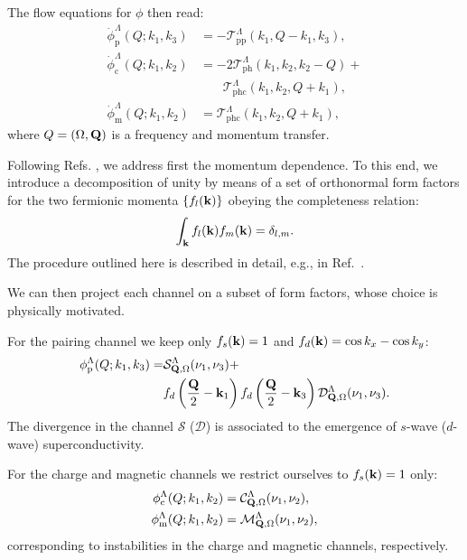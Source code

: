 The flow equations for $\phi$ then read: 
\begin{align}
\dot{\phi}_{\mathrm{p}}^{\Lambda}(Q;k_1,k_3) &= -\mathcal{T}^{\Lambda}_{\mathrm{pp}}(k_1,Q-k_1,k_3) , \\
\nonumber 
\dot{\phi}_{\mathrm{c}}^{\Lambda}(Q;k_1,k_2) &= 
 -2\mathcal{T}^{\Lambda}_{\mathrm{ph}}(k_1,k_2,k_2-Q) +\\
&\phantom{=}
\phantom{2}\mathcal{T}^{\Lambda}_{\mathrm{phc}}(k_1,k_2,Q+k_1) , \\
\dot{\phi}_{\mathrm{m}}^{\Lambda}(Q;k_1,k_2) &= \mathcal{T}^{\Lambda}_{\mathrm{phc}}(k_1,k_2,Q+k_1), 
\end{align}
where $Q=(\Omega,\mathbf{Q})$ is a frequency and momentum transfer. 
 

Following Refs. , we address first the momentum dependence. To this end, we introduce a decomposition of 
unity by means of a set of orthonormal form factors for the two fermionic momenta $\{f_{l}(\mathbf{k})\}$ obeying 
the completeness relation\cite{Lichtenstein2017}:
\begin{equation}
 \int_{\mathbf{k}}  f_{l}(\mathbf{k}) f_{m}(\mathbf{k}) = \delta_{l,m}.
\end{equation}
The procedure outlined here is described in detail, e.g., in Ref.~.

We can then project each channel on a subset of form factors, whose choice is physically motivated\cite{Husemann2009}. 

For the pairing channel we keep only $f_{s}(\mathbf{k}) = 1$ and $f_d(\mathbf{k})=\cos{k_x} - \cos{k_y}$:
\begin{align}
\nonumber
  \phi^{\Lambda}_{\mathrm{p}}(Q;k_1,k_3) =&
    \mathcal{S}^\Lambda_{\mathbf{Q},\Omega}(\nu_1,\nu_3) +   \\ 
    & f_d\left(\frac{\mathbf{Q}}{2}-\mathbf{k}_1\right) f_d\left(\frac{\mathbf{Q}}{2}-\mathbf{k}_3\right) \mathcal{D}^\Lambda_{\mathbf{Q},\Omega}(\nu_1,\nu_3).
\end{align}
The divergence in the channel $\mathcal{S}$ ($\mathcal{D}$) is associated to the emergence of $s$-wave ($d$-wave) superconductivity.\cite{Metzner2012,Platt2013}

For the charge and magnetic channels we restrict ourselves to $f_{s}(\mathbf{k})=1$ only:
\begin{align}
  \phi^\Lambda_{\mathrm{c}}(Q;k_1,k_2) &= \mathcal{C}^\Lambda_{\mathbf{Q},\Omega}(\nu_1,\nu_2), \\
  \phi^\Lambda_{\mathrm{m}}(Q;k_1,k_2) &= \mathcal{M}^\Lambda_{\mathbf{Q},\Omega}(\nu_1,\nu_2),
\end{align}
corresponding to instabilities in the charge and magnetic channels, respectively.

